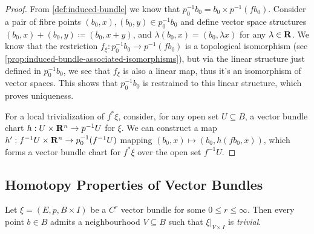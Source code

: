 \documentclass[../../../deep-dive]{subfile}
\begin{document}
\begin{proof}
From \cref{def:induced-bundle} we know that
\(p_0^{-1} b_0 = b_0 \times p^{-1} (f b_0)\). Consider a pair of fibre points
\((b_0, x), (b_0, y) \in p_0^{-1} b_0\) and define vector space structures
\((b_0, x) + (b_0, y) \coloneq (b_0, x + y)\), and
\(\lambda (b_0, x) = (b_0, \lambda x)\) for any \(\lambda \in \mathbf{R}\). We know that
the restriction \(f_{\xi}: p_0^{-1} b_0 \to p^{-1}(f b_0)\) is a topological
isomorphism (see \cref{prop:induced-bundle-associated-isomorphisms}), but via
the linear structure just defined in \(p_0^{-1} b_0\), we see that \(f_{\xi}\)
is also a linear map, thus it's an isomorphism of vector spaces. This shows that
\(p_0^{-1} b_0\) is restrained to this linear structure, which proves uniqueness.

For a local trivialization of \(f^{*} \xi\), consider, for any open set \(U
\subseteq B\), a vector bundle chart \(h: U \times \mathbf{R}^n \to p^{-1} U\) for
\(\xi\). We can construct a map \(h': f^{-1} U \times \mathbf{R}^n \to
p_0^{-1}(f^{-1} U)\) mapping \((b_0, x) \mapsto (b_0, h(f b_0, x))\), which
forms a vector bundle chart for \(f^{*} \xi\) over the open set \(f^{-1} U\).
\end{proof}

\subsection{Homotopy Properties of Vector Bundles}

\begin{lemma}
\label{lem:local-trivialization}
Let \(\xi = (E, p, B \times I)\) be a \(C^r\) vector bundle for some
\(0 \leq r \leq \infty\). Then every point \(b \in B\) admits a neighbourhood
\(V \subseteq B\) such that \(\xi|_{V \times I}\) is \emph{trivial}.
\end{lemma}
\end{document}
